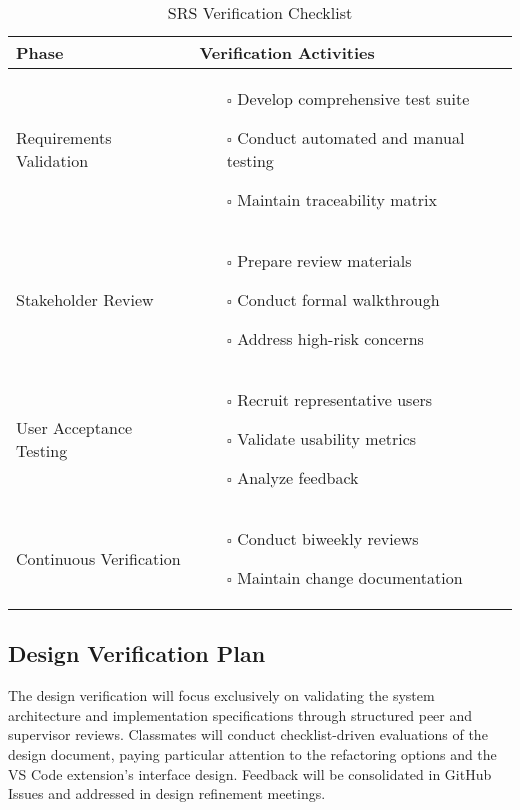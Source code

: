 \documentclass[12pt, titlepage]{article}
\begin{document}
\begin{table}[H]
\centering
\caption{SRS Verification Checklist}
\begin{tabular}{|p{}|p{}|}
\hline
\textbf{Phase} & \textbf{Verification Activities} \\ \hline
Requirements Validation & 
\begin{itemize}
    \item[$\square$] Develop comprehensive test suite
    \item[$\square$] Conduct automated and manual testing
    \item[$\square$] Maintain traceability matrix
\end{itemize} \\ \hline
Stakeholder Review & 
\begin{itemize}
    \item[$\square$] Prepare review materials
    \item[$\square$] Conduct formal walkthrough
    \item[$\square$] Address high-risk concerns
\end{itemize} \\ \hline
User Acceptance Testing & 
\begin{itemize}
    \item[$\square$] Recruit representative users
    \item[$\square$] Validate usability metrics
    \item[$\square$] Analyze feedback
\end{itemize} \\ \hline
Continuous Verification & 
\begin{itemize}
    \item[$\square$] Conduct biweekly reviews
    \item[$\square$] Maintain change documentation
\end{itemize} \\ \hline
\end{tabular}
\end{table}

\subsection{Design Verification Plan}

The design verification will focus exclusively on validating the system architecture and implementation specifications through structured peer and supervisor reviews. Classmates will conduct checklist-driven evaluations of the design document, paying particular attention to the refactoring options and the VS Code extension's interface design. Feedback will be consolidated in GitHub Issues and addressed in design refinement meetings.\\
\end{document}
